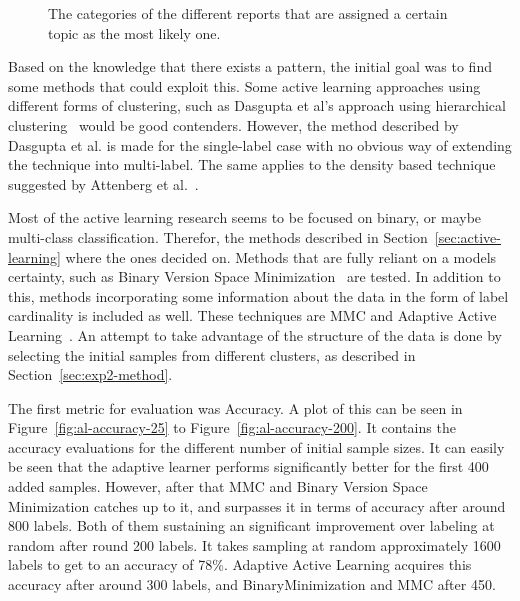 \begin{figure}[h!]
    \centering
    \quad
    \caption{The categories of the different reports that are assigned a certain topic as the most likely one.}
    \label{fig:topic-category-distribution}
\end{figure}

Based on the knowledge that there exists a pattern, the initial goal was to find some methods that could exploit this.
Some active learning approaches using different forms of clustering, such as Dasgupta et al\@'s approach using hierarchical clustering~\cite{dasgupta2008hierarchical} would be good contenders.
However, the method described by Dasgupta et al\@. is made for the single-label case with no obvious way of extending the technique into multi-label.
The same applies to the density based technique suggested by Attenberg et al\@.~\cite{attenberg2013class}.

Most of the active learning research seems to be focused on binary, or maybe multi-class classification.
Therefor, the methods described in Section~\ref{sec:active-learning} where the ones decided on.
Methods that are fully reliant on a models certainty, such as Binary Version Space Minimization~\cite{brinker2006active} are tested.
In addition to this, methods incorporating some information about the data in the form of label cardinality is included as well.
These techniques are MMC and Adaptive Active Learning~\cite{yang2009effective, li2013active}.
An attempt to take advantage of the structure of the data is done by selecting the initial samples from different clusters, as described in Section~\ref{sec:exp2-method}.

The first metric for evaluation was Accuracy.
A plot of this can be seen in Figure~\ref{fig:al-accuracy-25} to Figure~\ref{fig:al-accuracy-200}.
It contains the accuracy evaluations for the different number of initial sample sizes.
It can easily be seen that the adaptive learner performs significantly better for the first 400 added samples.
However, after that MMC and Binary Version Space Minimization catches up to it, and surpasses it in terms of accuracy after around 800 labels.
Both of them sustaining an significant improvement over labeling at random after round 200 labels.
It takes sampling at random approximately 1600 labels to get to an accuracy of 78\%.
Adaptive Active Learning acquires this accuracy after around 300 labels, and BinaryMinimization and MMC after 450.


